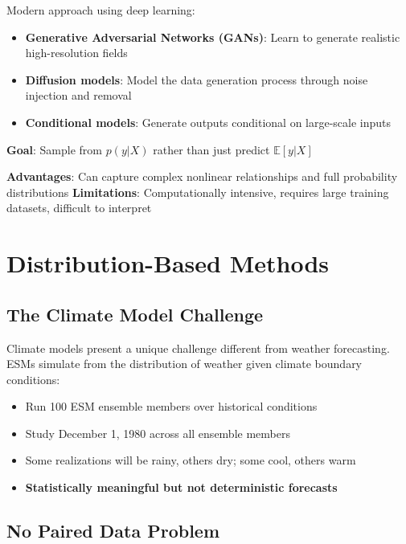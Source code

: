 \documentclass[
  letterpaper,
  DIV=11,
  numbers=noendperiod]{scrreprt}
\providecommand{\tightlist}{%
  \setlength{\itemsep}{0pt}\setlength{\parskip}{0pt}}
\begin{document}
Modern approach using deep learning:

\begin{itemize}
\tightlist
\item
  \textbf{Generative Adversarial Networks (GANs)}: Learn to generate
  realistic high-resolution fields
\item
  \textbf{Diffusion models}: Model the data generation process through
  noise injection and removal
\item
  \textbf{Conditional models}: Generate outputs conditional on
  large-scale inputs
\end{itemize}

\textbf{Goal}: Sample from \(p(y|X)\) rather than just predict
\(\mathbb{E}[y|X]\)

\textbf{Advantages}: Can capture complex nonlinear relationships and
full probability distributions \textbf{Limitations}: Computationally
intensive, requires large training datasets, difficult to interpret

\section{Distribution-Based Methods}\label{distribution-based-methods}

\subsection{The Climate Model
Challenge}\label{the-climate-model-challenge}

Climate models present a unique challenge different from weather
forecasting. ESMs simulate from the distribution of weather given
climate boundary conditions:

\begin{itemize}
\tightlist
\item
  Run 100 ESM ensemble members over historical conditions
\item
  Study December 1, 1980 across all ensemble members
\item
  Some realizations will be rainy, others dry; some cool, others warm
\item
  \textbf{Statistically meaningful but not deterministic forecasts}
\end{itemize}

\subsection{No Paired Data Problem}\label{no-paired-data-problem}
\end{document}
